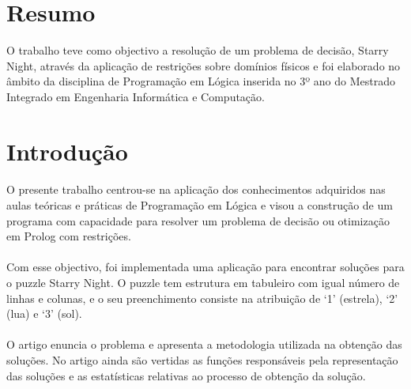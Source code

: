 \documentclass[a4paper]{article}
\begin{document}
\newpage

\tableofcontents



\newpage

\section*{Resumo}

O trabalho teve como objectivo a resolução de um problema de decisão, Starry Night, através da aplicação de restrições sobre domínios físicos e foi elaborado no âmbito da disciplina de Programação em Lógica inserida no 3º ano do Mestrado Integrado em Engenharia Informática e Computação. 

\section{Introdução}

\paragraph{}
O presente trabalho centrou-se na aplicação dos conhecimentos adquiridos nas aulas teóricas e práticas de Programação em Lógica e visou a construção de um programa com capacidade para resolver um problema de decisão ou otimização em Prolog com restrições.

\paragraph{}
Com esse objectivo, foi implementada uma aplicação para encontrar soluções para o puzzle Starry Night. O puzzle tem estrutura em tabuleiro com igual número de linhas e colunas, e o seu preenchimento consiste na atribuição de ‘1’ (estrela), ‘2’ (lua) e ‘3’ (sol).

\paragraph{}
O artigo enuncia o problema e apresenta a metodologia utilizada na obtenção das soluções. No artigo ainda são vertidas as funções responsáveis pela representação das soluções e as estatísticas relativas ao processo de obtenção da solução. 
\end{document}
